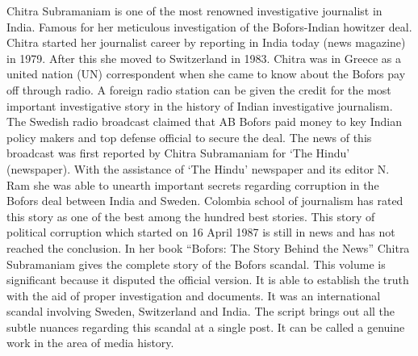 \begin{multicols}{2}
\noi
Chitra Subramaniam is one of the most renowned investigative journalist in India. Famous for
her meticulous investigation of the Bofors-Indian howitzer deal. Chitra started her journalist
career by reporting in India today (news magazine) in 1979. After this she moved to
Switzerland in 1983. Chitra was in Greece as a united nation (UN) correspondent when she
came to know about the Bofors pay off through radio. A foreign radio station can be given the
credit for the most important investigative story in the history of Indian investigative
journalism. The Swedish radio broadcast claimed that AB Bofors paid money to key Indian
policy makers and top defense official to secure the deal. The news of this broadcast was first
reported by Chitra Subramaniam for ‘The Hindu’ (newspaper). With the assistance of ‘The
Hindu’ newspaper and its editor N. Ram she was able to unearth important secrets regarding
corruption in the Bofors deal between India and Sweden. Colombia school of journalism has
rated this story as one of the best among the hundred best stories. This story of political
corruption which started on 16 April 1987 is still in news and has not reached the conclusion.
In her book “Bofors: The Story Behind the News” Chitra Subramaniam gives the complete
story of the Bofors scandal. This volume is significant because it disputed the official version.
It is able to establish the truth with the aid of proper investigation and documents. It was an international scandal involving Sweden, Switzerland and India. The script brings out all the
subtle nuances regarding this scandal at a single post. It can be called a genuine work in the
area of media history.


\end{multicols}
